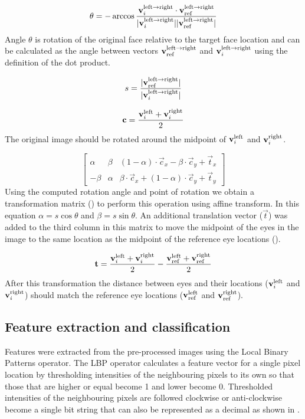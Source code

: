 \begin{equation}
    \label{eq:spec:analysis:preproc:angle}
    \theta = -\arccos{\frac{\mathbf{v}_i^{\text{left} \rightarrow \text{right}}\cdot \mathbf{v}_{\text{ref}}^{\text{left} \rightarrow \text{right}}}{|\mathbf{v}_i^{\text{left} \rightarrow \text{right}}| |\mathbf{v}_{\text{ref}}^{\text{left} \rightarrow \text{right}}|}}
\end{equation}
Angle $\theta$ is rotation of the original face relative to the target face
location and can be calculated as the angle between vectors $\mathbf{v}_{\text{ref}}^{\text{left} \rightarrow \text{right}}$ and
$\mathbf{v}_i^{\text{left} \rightarrow \text{right}}$ using the definition of the dot product.

\begin{equation}
    \label{eq:spec:analysis:preproc:scales}
    s = \frac{|\mathbf{v}_{\text{ref}}^{\text{left} \rightarrow \text{right}}|}{|\mathbf{v}_i^{\text{left} \rightarrow \text{right}}|}
\end{equation}

\begin{equation}
    \label{eq:spec:analysis:preproc:centre}
    \mathbf{c} = \frac{\mathbf{v}_i^{\text{left}} + \mathbf{v}_i^{\text{right}}}{2}
\end{equation}
The original image should be rotated around the midpoint of $\mathbf{v}_i^{\text{left}}$ and
$\mathbf{v}_i^{\text{right}}$.

\begin{equation}
    \label{eq:spec:analysis:preproc:mat}
    \begin{bmatrix}
    \alpha & \beta  & (1-\alpha)\cdot \vec{c}_x - \beta \cdot \vec{c}_y + \vec{t}_x \\
    -\beta & \alpha & \beta \cdot \vec{c}_x + (1-\alpha)\cdot \vec{c}_y + \vec{t}_y
    \end{bmatrix}
\end{equation}
Using the computed rotation angle and point of rotation we obtain a
transformation matrix () to perform this operation
using affine transform. In this equation $\alpha = s\cos\theta$ and $\beta =
s\sin\theta$. An additional translation vector ($\vec{t}$) was added to the
third column in this matrix to move the midpoint of the eyes in the image to
the same location as the midpoint of the reference eye locations (). 

\begin{equation}
    \label{eq:spec:analysis:preproc:midtr}
    \mathbf{t} = \frac{\mathbf{v}_i^{\text{left}} + \mathbf{v}_i^{\text{right}}}{2} - \frac{\mathbf{v}_{\text{ref}}^{\text{left}} + \mathbf{v}_{\text{ref}}^{\text{right}}}{2}
\end{equation}
After this transformation the distance between eyes and their locations
($\mathbf{v}_i^{\text{left}}$ and $\mathbf{v}_i^{\text{right}}$) should match the reference eye locations
($\mathbf{v}_{\text{ref}}^{\text{left}}$ and $\mathbf{v}_{\text{ref}}^{\text{right}}$).

\subsection{Feature extraction and classification}
Features were extracted from the pre-processed images using the Local Binary
Patterns operator. The LBP operator calculates a feature vector for a single
pixel location by thresholding intensities of the neighbouring pixels to its
own so that those that are higher or equal become 1 and lower become 0.
Thresholded intensities of the neighbouring pixels are followed clockwise or
anti-clockwise become a single bit string that can also be represented as a
decimal as shown in .

